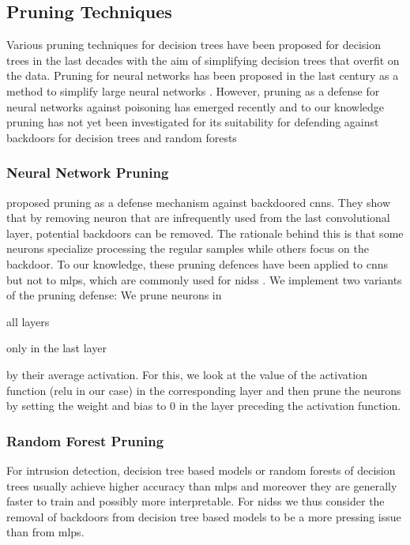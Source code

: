 \documentclass[10pt,sigconf,letterpaper,dvipsnames]{acmart}
\begin{document}
\subsection{Pruning Techniques}

Various pruning techniques for decision trees have been proposed for decision trees in the last decades \cite{esposito_comparative_1997} with the aim of simplifying decision trees that overfit on the data. Pruning for neural networks has been proposed in the last century as a method to simplify large neural networks \cite{sietsma_neural_1988}. However, pruning as a defense for neural networks against poisoning has emerged recently \cite{gu_badnets:_2017} and to our knowledge pruning has not yet been investigated for its suitability for defending against backdoors for decision trees and random forests

\subsubsection{Neural Network Pruning}

\cite{gu_badnets:_2017} proposed pruning as a defense mechanism against backdoored \glspl{cnn}. They show that by removing neuron that are infrequently used from the last convolutional layer, potential backdoors can be removed. The rationale behind this is that some neurons specialize processing the regular samples while others focus on the backdoor. To our knowledge, these pruning defences have been applied to \glspl{cnn} but not to \glspl{mlp}, which are commonly used for \glspl{nids} \cite{meghdouri_analysis_2018}. We implement two variants of the pruning defense: We prune neurons in \begin{enumerate*}\item all layers \item only in the last layer \end{enumerate*} by their average activation. For this, we look at the value of the activation function (\gls{relu} in our case) in the corresponding layer and then prune the neurons by setting the weight and bias to 0 in the layer preceding the activation function. 

\subsubsection{Random Forest Pruning}
For intrusion detection, decision tree based models or random forests of decision trees  usually achieve higher accuracy than \glspl{mlp} \cite{meghdouri_analysis_2018} and moreover they are generally faster to train and possibly more interpretable. For \glspl{nids} we thus consider the removal of backdoors from decision tree based models to be a more pressing issue than from \glspl{mlp}. 
\end{document}
